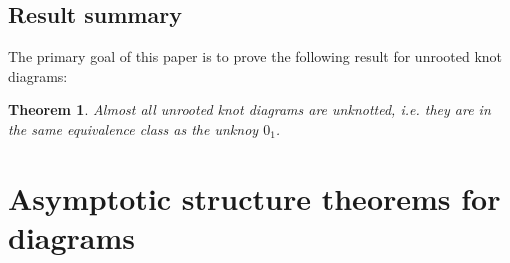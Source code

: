 \documentclass[amsmath,longbibliography,secnumarabic,floatfix,amssymb,nofootinbib,nobibnotes,letterpaper,11pt,tightenlines,notitlepage,showkeys,showlabels]{amsart}%
\newtheorem{theorem}{Theorem}
\newtheorem{corollary}[theorem]{Corollary}
\theoremstyle{definition}
\begin{document}





\subsection{Result summary}
\label{sec:result-summary}

The primary goal of this paper is to prove the following result for
unrooted knot diagrams:

\begin{theorem}
  Almost all unrooted knot diagrams are unknotted, i.e. they are in
  the same equivalence class as the unknoy $0_1$.
\end{theorem}

\section{Asymptotic structure theorems for diagrams}
\label{sec:structure}
\end{document}
